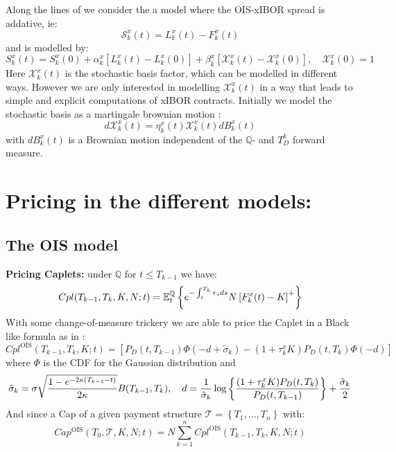 \documentclass[12pt]{article}
\begin{document}
Along the lines of \cite{MercXieStochBasis2012} we consider the
a model where the OIS-xIBOR spread is addative, ie:
\begin{equation}
    \mathcal{S}_k^x(t) = L_k^x(t) - F_k^x(t)
\end{equation}
and is modelled by:
\begin{equation}\label{eq:BasisSpreadDef}
     S_k^x(t) = S_k^x(0) +
    \alpha_k^x \left[L_k^x(t) - L_k^x(0)\right] +
    \beta^x_k \left[\mathcal{X}_k^x(t) - \mathcal{X}_k^x(0)\right],\quad \mathcal{X}_k^x(0)=1
\end{equation}
Here $\mathcal{X}_k^x(t)$ is the stochastic basis factor,
which can be modelled in different ways. However we are
only interested in modelling $\mathcal{X}_k^x(t)$ in a
way that leads to simple and explicit computations of
xIBOR contracts. Initially we model the stochastic basis as a
martingale brownian motion :
\begin{equation} \label{eq:StocBasis}
     d\mathcal{X}_k^x(t) = \eta ^x _k(t) \mathcal{X}_k^x(t) dB_k^x(t)
\end{equation}
with $dB_k^x(t)$ is a Brownian motion independent of the $\mathbb{Q}$- and
$T^k_D$ forward measure.
\section{Pricing in the different models:}
\subsection{The OIS model}
\textbf{Pricing Caplets:}
under $\mathbb{Q}$ for $t \leq T_{k-1}$ we have:
\begin{equation}
    \notag Cpl(T _{k-1} , T_k , K , N; t) =
    \mathbb{E}^\mathbb{Q}_t
    \left\{ e ^{-\int_t ^{T_k} r_s ds}
    N\left[F_k^x(t) - K\right]^+\right\}
\end{equation}
With some change-of-measure trickery we are able to
price the Caplet in a Black like formula as in \cite{IRModels}:
\begin{equation}
    Cpl^{\text{OIS}}(T_{k-1},T_k , K ; t) =
    \left[P_D(t,T_{k-1}) \Phi(-d + \tilde \sigma_k)
    - (1+\tau_k^x K) P_D(t,T_k) \Phi(-d)\right]
\end{equation}
where $\Phi$ is the CDF for the Gaussian distribution
and
\begin{equation}
    \notag \tilde \sigma_k = \sigma \sqrt{\frac{1-e ^{-2\kappa(T_{k-1} - t)}}{2\kappa}}
    B(T_{k-1} , T_k),\quad
     d = \frac{1}{\tilde \sigma_k}\log
     \left\{ \frac{(1+\tau_k^x K )P_D(t,T_k)}{P_D(t,T_{k-1})} \right\}
     + \frac{\tilde \sigma _k}{2}
\end{equation}
And since a Cap of a given payment structure
$\mathcal{T}= \left\{ T_1 , \dots , T_n \right\}$ with:
\begin{equation}
    Cap ^{\text{OIS}}(T_0 , \mathcal{T} , K , N ; t )
    = N \sum_{k=1}^n Cpl ^{\text{OIS}}
    (T_{k-1} , T_k , K , N ; t)
\end{equation}
\end{document}

